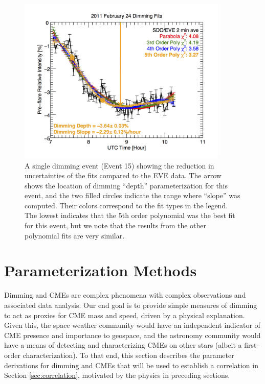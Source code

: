 \begin{figure}[!h]
    \begin{center}
	    \includegraphics[width=100mm]{Images/DimmingFitsExample.png}
    \end{center}
    \caption[Dimming fits example]{
        A single dimming event (Event 15) showing the reduction in uncertainties of the fits compared to the EVE data. The
        arrow shows the location of dimming “depth” parameterization for this event, and the two filled circles indicate the 
        range where “slope” was computed. Their colors correspond to the fit types in the legend. The lowest  indicates 
        that the 5th order polynomial was the best fit for this event, but we note that the results from the other 
        polynomial fits are very similar.
   	}
    \label{fig:fitsexample}
\end{figure}

\section{Parameterization Methods}
\label{sec:parameterization}
Dimming and CMEs are complex phenomena with complex observations and associated data analysis. Our end goal is to provide simple measures of dimming to act as proxies for CME mass and speed, driven by a physical explanation. Given this, the space weather community would have an independent indicator of CME presence and importance to geospace, and the astronomy community would have a means of detecting and characterizing CMEs on other stars (albeit a first-order characterization). To that end, this section describes the parameter derivations for dimming and CMEs that will be used to establish a correlation in Section \ref{sec:correlation}, motivated by the physics in preceding sections. 

